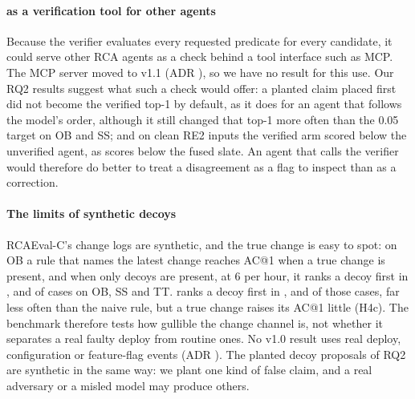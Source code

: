 \paragraph{\sys as a verification tool for other agents}
Because the verifier evaluates every requested predicate for every candidate, it could serve other RCA agents as a check behind a tool interface such as MCP.
The MCP server moved to v1.1 (ADR \allowbreak{}), so we have no result for this use.
Our RQ2 results suggest what such a check would offer: a planted claim placed first did not become the verified top-1 by default, as it does for an agent that follows the model's order, although it still changed that top-1 more often than the 0.05 target on OB and SS; and on clean RE2 inputs the verified arm scored below the unverified agent, as  scores below the fused slate.
An agent that calls the verifier would therefore do better to treat a disagreement as a flag to inspect than as a correction.

\paragraph{The limits of synthetic decoys}
RCAEval-C's change logs are synthetic, and the true change is easy to spot: on OB a rule that names the latest change reaches AC@1  when a true change is present, and when only decoys are present, at 6 per hour, it ranks a decoy first in ,  and  of cases on OB, SS and TT.
\sys ranks a decoy first in ,  and  of those cases, far less often than the naive rule, but a true change raises its AC@1 little (H4c).
The benchmark therefore tests how gullible the change channel is, not whether it separates a real faulty deploy from routine ones.
No v1.0 result uses real deploy, configuration or feature-flag events (ADR \allowbreak{}).
The planted decoy proposals of RQ2 are synthetic in the same way: we plant one kind of false claim, and a real adversary or a misled model may produce others.
